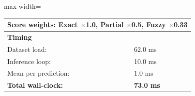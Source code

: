 \begin{table}[htbp]
\begin{adjustbox}{max width=\textwidth}
\begin{tabular}{r p{5cm} r r r r}
\multicolumn{6}{l}{Score weights: Exact $\times$1.0, Partial $\times$0.5, Fuzzy $\times$0.33} \\
\midrule
\multicolumn{6}{l}{\textbf{Timing}} \\
\midrule
\multicolumn{3}{l}{Dataset load:} & \multicolumn{3}{l}{62.0 ms} \\
\multicolumn{3}{l}{Inference loop:} & \multicolumn{3}{l}{10.0 ms} \\
\multicolumn{3}{l}{Mean per prediction:} & \multicolumn{3}{l}{1.0 ms} \\
\multicolumn{3}{l}{\textbf{Total wall-clock:}} & \multicolumn{3}{l}{\textbf{73.0 ms}} \\
\bottomrule
\end{tabular}
\end{adjustbox}
\end{table}
